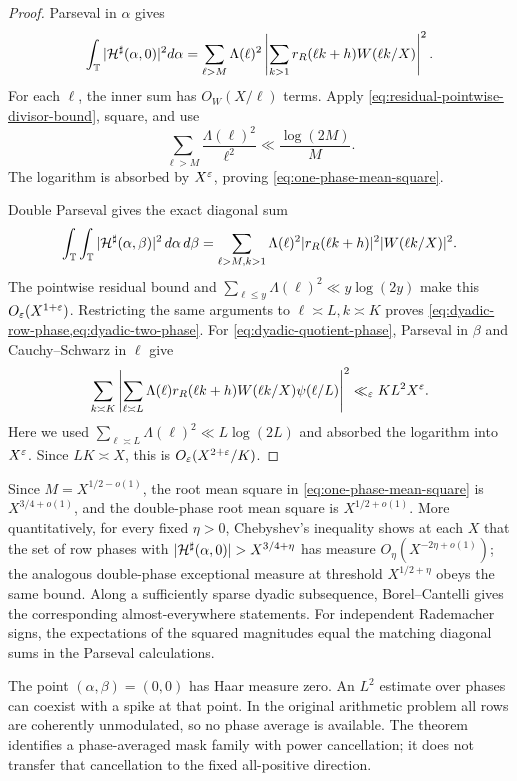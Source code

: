 \begin{proof}
Parseval in $\alpha$ gives
\begin{equation}
 \int_\mathbb T|\mathcal H^\sharp(\alpha,0)|^2d\alpha
 =\sum_{\ell>M}\Lambda(\ell)^2
 \left|\sum_{k>1}r_R(\ell k+h)W(\ell k/X)\right|^2.
 \label{eq:one-phase-Parseval}
\end{equation}
For each $\ell$, the inner sum has $O_W(X/\ell)$ terms.  Apply
\eqref{eq:residual-pointwise-divisor-bound}, square, and use
\[
 \sum_{\ell>M}\frac{\Lambda(\ell)^2}{\ell^2}
 \ll\frac{\log(2M)}M.
\]
The logarithm is absorbed by $X^\varepsilon$, proving
\eqref{eq:one-phase-mean-square}.

Double Parseval gives the exact diagonal sum
\begin{align*}
 \int_\mathbb T\int_\mathbb T|\mathcal H^\sharp(\alpha,\beta)|^2
 \,d\alpha\,d\beta
 =\sum_{\ell>M,k>1}
 \Lambda(\ell)^2|r_R(\ell k+h)|^2|W(\ell k/X)|^2.
\end{align*}
The pointwise residual bound and
$\sum_{\ell\le y}\Lambda(\ell)^2\ll y\log(2y)$ make this
$O_\varepsilon(X^{1+\varepsilon})$.  Restricting the same arguments to
$\ell\asymp L,k\asymp K$ proves
\cref{eq:dyadic-row-phase,eq:dyadic-two-phase}.  For
\eqref{eq:dyadic-quotient-phase}, Parseval in $\beta$ and Cauchy--Schwarz
in $\ell$ give
\[
 \sum_{k\asymp K}
 \left|\sum_{\ell\asymp L}\Lambda(\ell)
 r_R(\ell k+h)W(\ell k/X)\psi(\ell/L)\right|^2
 \ll_\varepsilon KL^2X^\varepsilon.
\]
Here we used
$\sum_{\ell\asymp L}\Lambda(\ell)^2\ll L\log(2L)$ and absorbed the
logarithm into $X^\varepsilon$.  Since $LK\asymp X$, this is
$O_\varepsilon(X^{2+\varepsilon}/K)$.
\end{proof}

Since $M=X^{1/2-o(1)}$, the root mean square in
\eqref{eq:one-phase-mean-square} is $X^{3/4+o(1)}$, and the double-phase
root mean square is $X^{1/2+o(1)}$.  More quantitatively, for every fixed
$\eta>0$, Chebyshev's inequality shows at each $X$ that the set of row
phases with $|\cH^\sharp(\alpha,0)|>X^{3/4+\eta}$ has measure
$O_\eta(X^{-2\eta+o(1)})$; the analogous double-phase exceptional measure
at threshold $X^{1/2+\eta}$ obeys the same bound.  Along a sufficiently
sparse dyadic subsequence, Borel--Cantelli gives the corresponding
almost-everywhere statements.  For independent Rademacher signs, the
expectations of the squared magnitudes equal the matching diagonal sums
in the Parseval calculations.

\begin{remark}
The point $(\alpha,\beta)=(0,0)$ has Haar measure zero.  An $L^2$ estimate
over phases can coexist with a spike at that point.  In the original
arithmetic problem all rows are coherently unmodulated, so no phase
average is available.  The theorem identifies a phase-averaged mask family
with power cancellation; it does not transfer that cancellation to the
fixed all-positive direction.
\end{remark}

